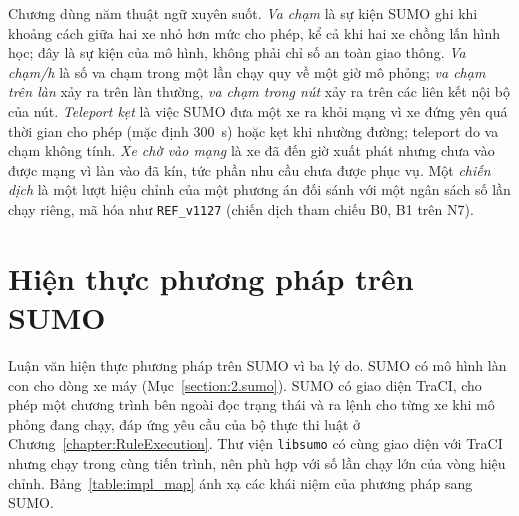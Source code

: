 \documentclass[../main.tex]{subfiles}
\begin{document}
Chương dùng năm thuật ngữ xuyên suốt. \emph{Va chạm} là sự kiện SUMO ghi khi khoảng cách giữa hai xe nhỏ hơn mức cho phép, kể cả khi hai xe chồng lấn hình học; đây là sự kiện của mô hình, không phải chỉ số an toàn giao thông. \emph{Va chạm/h} là số va chạm trong một lần chạy quy về một giờ mô phỏng; \emph{va chạm trên làn} xảy ra trên làn thường, \emph{va chạm trong nút} xảy ra trên các liên kết nội bộ của nút. \emph{Teleport kẹt} là việc SUMO đưa một xe ra khỏi mạng vì xe đứng yên quá thời gian cho phép (mặc định 300~s) hoặc kẹt khi nhường đường; teleport do va chạm không tính. \emph{Xe chờ vào mạng} là xe đã đến giờ xuất phát nhưng chưa vào được mạng vì làn vào đã kín, tức phần nhu cầu chưa được phục vụ. Một \emph{chiến dịch} là một lượt hiệu chỉnh của một phương án đối sánh với một ngân sách số lần chạy riêng, mã hóa như \texttt{REF\_v1127} (chiến dịch tham chiếu B0, B1 trên N7).

\section{Hiện thực phương pháp trên SUMO}
\label{section:impl_sumo}

Luận văn hiện thực phương pháp trên SUMO vì ba lý do. SUMO có mô hình làn con cho dòng xe máy (Mục~\ref{section:2.sumo}). SUMO có giao diện TraCI, cho phép một chương trình bên ngoài đọc trạng thái và ra lệnh cho từng xe khi mô phỏng đang chạy, đáp ứng yêu cầu của bộ thực thi luật ở Chương~\ref{chapter:RuleExecution}. Thư viện \texttt{libsumo} có cùng giao diện với TraCI nhưng chạy trong cùng tiến trình, nên phù hợp với số lần chạy lớn của vòng hiệu chỉnh. Bảng~\ref{table:impl_map} ánh xạ các khái niệm của phương pháp sang SUMO.
\end{document}
